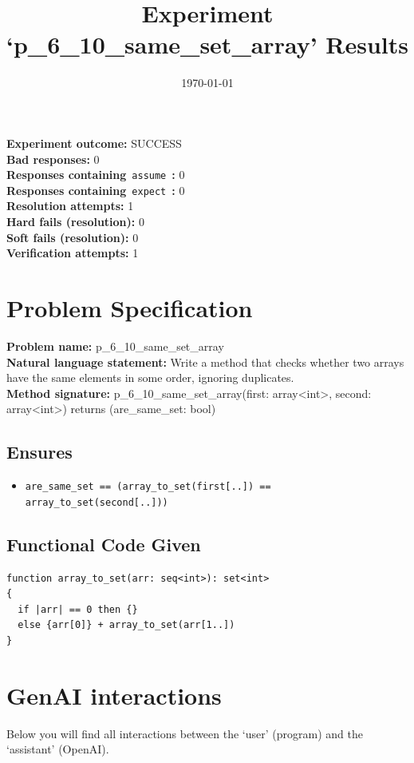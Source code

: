\documentclass{article}
\begin{document}
\title{Experiment `p\_6\_10\_same\_set\_array' Results}
\author{\today}
\date{}
\maketitle
\textbf{Experiment outcome: }SUCCESS
\\\textbf{Bad responses: }0
\\\textbf{Responses containing}~\texttt{assume}~\textbf{: }0
\\\textbf{Responses containing}~\texttt{expect}~\textbf{: }0
\\\textbf{Resolution attempts: }1
\\\textbf{Hard fails (resolution): }0
\\\textbf{Soft fails (resolution): }0
\\\textbf{Verification attempts: }1
\section*{Problem Specification}
\textbf{Problem name: }p\_6\_10\_same\_set\_array
\\\textbf{Natural language statement: }Write a method that checks whether two arrays have the same elements in some order, ignoring duplicates.
\\\textbf{Method signature: }p\_6\_10\_same\_set\_array(first: array<int>, second: array<int>) returns (are\_same\_set: bool)
\subsection*{Ensures}
\begin{itemize}
\item \texttt{are\_same\_set == (array\_to\_set(first[..]) == array\_to\_set(second[..]))}
\end{itemize}
\subsection*{Functional Code Given}
\begin{lstlisting}
function array_to_set(arr: seq<int>): set<int>
{
  if |arr| == 0 then {}
  else {arr[0]} + array_to_set(arr[1..])
}
\end{lstlisting}
\clearpage
\section*{GenAI interactions}
Below you will find all interactions between the `user' (program) and the `assistant' (OpenAI).
\end{document}
